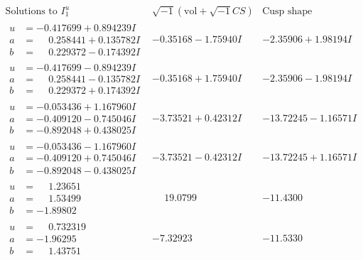 \documentclass[1p]{elsarticle_modified}
\theoremstyle{definition}
\newcommand{\I}{\sqrt{-1}}
\begin{document}
$$\begin{array}{c|c|c}  
\text{Solutions to }I^u_{1}& \I (\text{vol} + \sqrt{-1}CS) & \text{Cusp shape}\\
 \hline 
\begin{aligned}
u &= -0.417699 + 0.894239 I \\
a &= \phantom{-}0.258441 + 0.135782 I \\
b &= \phantom{-}0.229372 - 0.174392 I\end{aligned}
 & -0.35168 - 1.75940 I & -2.35906 + 1.98194 I \\ \hline\begin{aligned}
u &= -0.417699 - 0.894239 I \\
a &= \phantom{-}0.258441 - 0.135782 I \\
b &= \phantom{-}0.229372 + 0.174392 I\end{aligned}
 & -0.35168 + 1.75940 I & -2.35906 - 1.98194 I \\ \hline\begin{aligned}
u &= -0.053436 + 1.167960 I \\
a &= -0.409120 - 0.745046 I \\
b &= -0.892048 + 0.438025 I\end{aligned}
 & -3.73521 + 0.42312 I & -13.72245 - 1.16571 I \\ \hline\begin{aligned}
u &= -0.053436 - 1.167960 I \\
a &= -0.409120 + 0.745046 I \\
b &= -0.892048 - 0.438025 I\end{aligned}
 & -3.73521 - 0.42312 I & -13.72245 + 1.16571 I \\ \hline\begin{aligned}
u &= \phantom{-}1.23651\phantom{ +0.000000I} \\
a &= \phantom{-}1.53499\phantom{ +0.000000I} \\
b &= -1.89802\phantom{ +0.000000I}\end{aligned}
 & \phantom{-}19.0799\phantom{ +0.000000I} & -11.4300\phantom{ +0.000000I} \\ \hline\begin{aligned}
u &= \phantom{-}0.732319\phantom{ +0.000000I} \\
a &= -1.96295\phantom{ +0.000000I} \\
b &= \phantom{-}1.43751\phantom{ +0.000000I}\end{aligned}
 & -7.32923\phantom{ +0.000000I} & -11.5330\phantom{ +0.000000I} \\ \hline\begin{aligned}

\end{aligned}
\end{array}$$
\end{document}
